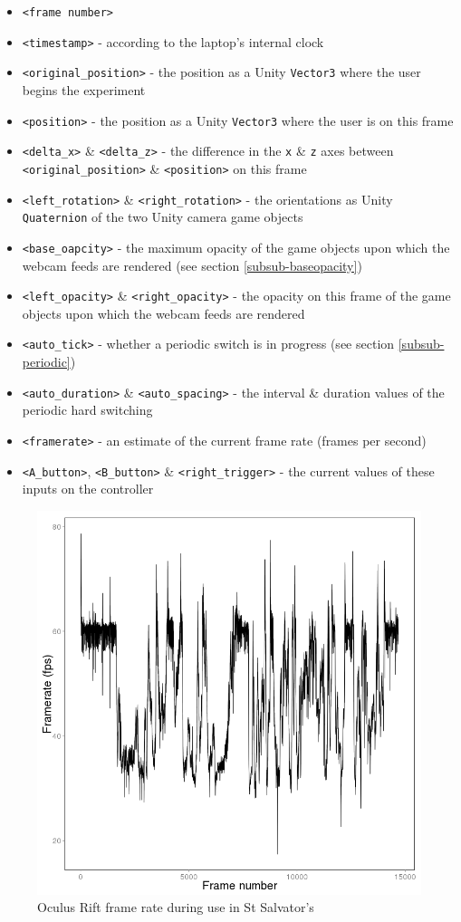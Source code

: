 \documentclass[conference]{acmsiggraph}
\begin{document}
\begin{itemize}
	\item \texttt{<frame number>}
	\item \texttt{<timestamp>} - according to the laptop's internal clock
	\item \texttt{<original\_position>} - the position as a Unity \texttt{Vector3} where the user begins the experiment
	\item \texttt{<position>} - the position as a Unity \texttt{Vector3} where the user is on this frame
	\item \texttt{<delta\_x>} \& \texttt{<delta\_z>} - the difference in the \texttt{x} \& \texttt{z} axes between \texttt{<original\_position>} \& \texttt{<position>} on this frame
	\item \texttt{<left\_rotation>} \& \texttt{<right\_rotation>} - the orientations as Unity \texttt{Quaternion} of the two Unity camera game objects
	\item \texttt{<base\_oapcity>} - the maximum opacity of the game objects upon which the webcam feeds are rendered (see section \ref{subsub-baseopacity})
	\item \texttt{<left\_opacity>} \& \texttt{<right\_opacity>} - the opacity on this frame of the game objects upon which the webcam feeds are rendered
	\item \texttt{<auto\_tick>} - whether a periodic switch is in progress (see section \ref{subsub-periodic})
	\item \texttt{<auto\_duration>} \& \texttt{<auto\_spacing>} - the interval \& duration values of the periodic hard switching
	\item \texttt{<framerate>} - an estimate of the current frame rate (frames per second)
	\item \texttt{<A\_button>}, \texttt{<B\_button>} \& \texttt{<right\_trigger>} - the current values of these inputs on the controller
\end{itemize}


\begin{figure}[h]
	\begin{center}
		\includegraphics[width=.4\textwidth]{images/framerate3}
	\end{center}
	\caption{Oculus Rift frame rate during use in St Salvator's}
	\label{frame}
\end{figure}
\end{document}
